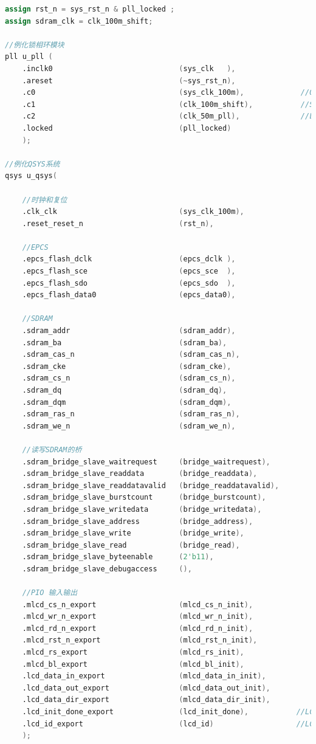 \documentclass[12pt,hyperref,a4paper,UTF8]{ctexart}
\begin{document}
\begin{lstlisting}[language=Verilog]
assign rst_n = sys_rst_n & pll_locked ;
assign sdram_clk = clk_100m_shift;

//例化锁相环模块
pll u_pll (
    .inclk0                             (sys_clk   ),
    .areset                             (~sys_rst_n),
    .c0                                 (sys_clk_100m),             //QSYS 系统时钟
    .c1                                 (clk_100m_shift),           //SDRAM 时钟
    .c2                                 (clk_50m_pll),              //LCD 驱动时钟
    .locked                             (pll_locked)
    );

//例化QSYS系统
qsys u_qsys(

    //时钟和复位
    .clk_clk                            (sys_clk_100m),
    .reset_reset_n                      (rst_n),
        
    //EPCS  
    .epcs_flash_dclk                    (epcs_dclk ),
    .epcs_flash_sce                     (epcs_sce  ),
    .epcs_flash_sdo                     (epcs_sdo  ),
    .epcs_flash_data0                   (epcs_data0),
        
    //SDRAM 
    .sdram_addr                         (sdram_addr),
    .sdram_ba                           (sdram_ba),
    .sdram_cas_n                        (sdram_cas_n),
    .sdram_cke                          (sdram_cke),
    .sdram_cs_n                         (sdram_cs_n),
    .sdram_dq                           (sdram_dq),
    .sdram_dqm                          (sdram_dqm),
    .sdram_ras_n                        (sdram_ras_n),
    .sdram_we_n                         (sdram_we_n),

    //读写SDRAM的桥     
    .sdram_bridge_slave_waitrequest     (bridge_waitrequest),
    .sdram_bridge_slave_readdata        (bridge_readdata),
    .sdram_bridge_slave_readdatavalid   (bridge_readdatavalid),
    .sdram_bridge_slave_burstcount      (bridge_burstcount),
    .sdram_bridge_slave_writedata       (bridge_writedata),
    .sdram_bridge_slave_address         (bridge_address),
    .sdram_bridge_slave_write           (bridge_write),
    .sdram_bridge_slave_read            (bridge_read),
    .sdram_bridge_slave_byteenable      (2'b11),
    .sdram_bridge_slave_debugaccess     (),
    
    //PIO 输入输出
    .mlcd_cs_n_export                   (mlcd_cs_n_init),            
    .mlcd_wr_n_export                   (mlcd_wr_n_init),            
    .mlcd_rd_n_export                   (mlcd_rd_n_init),            
    .mlcd_rst_n_export                  (mlcd_rst_n_init),            
    .mlcd_rs_export                     (mlcd_rs_init),            
    .mlcd_bl_export                     (mlcd_bl_init),            
    .lcd_data_in_export                 (mlcd_data_in_init),            
    .lcd_data_out_export                (mlcd_data_out_init),            
    .lcd_data_dir_export                (mlcd_data_dir_init),            
    .lcd_init_done_export               (lcd_init_done),           //LCD初始化完成    
    .lcd_id_export                      (lcd_id)                   //LCD ID     
    );
    

\end{lstlisting}
\end{document}
